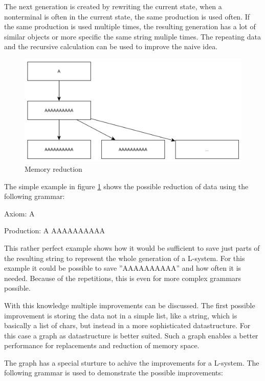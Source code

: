 \documentclass[english]{cpp-hmwk}
\begin{document}
The next generation is created by rewriting the current state, when a nonterminal is often in the current state, the same production is used often. If the same production is used multiple times, the resulting generation has a lot of similar objects or more specific the same string muliple times. The repeating data and the recursive calculation can be used to improve the naive idea.

\medskip
\begin{figure}[h!]
	\centering
	\includegraphics[width=0.8\columnwidth]{../graphs/simple_grammar_data_doubling.png}
	\caption{Memory reduction}
	\label{figure:lsystem_mem_reduction}
\end{figure}

\noindent The simple example in figure \ref{figure:lsystem_mem_reduction} shows the possible reduction of data using the following grammar:

Axiom: A

Production: A \rightarrow AAAAAAAAAA 

\medskip
\noindent This rather perfect example shows how it would be sufficient to save just parts of the resulting string to represent the whole generation of a L-system. For this example it could be possible to save ''AAAAAAAAAA'' and how often it is needed. Because of the repetitions, this is even for more complex grammars possible.

\medskip
\noindent With this knowledge multiple improvements can be discussed. The first possible improvement is storing the data not in a simple list, like a string, which is basically a list of chars, but instead in a more sophisticated datastructure. For this case a graph as datastructure is better suited. Such a graph enables a better performance for replacements and reduction of memory space.

\medskip
\noindent The graph has a special sturture to achive the improvements for a L-system. The following grammar is used to demonstrate the possible improvements:
 
\end{document}
